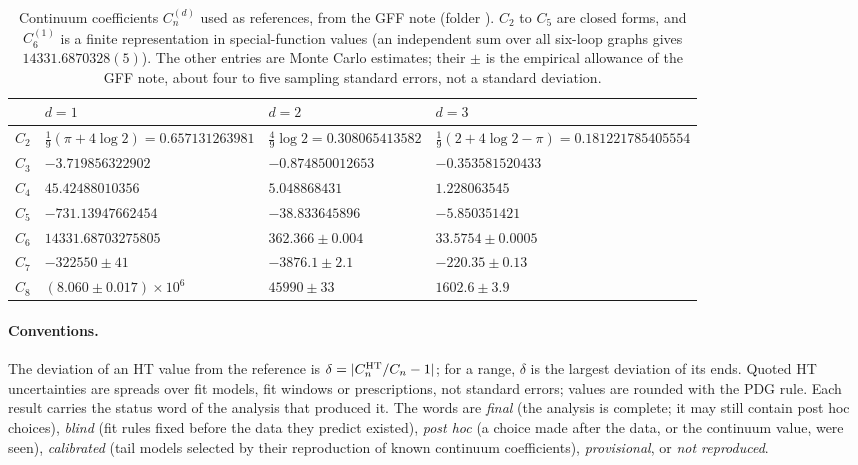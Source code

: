 \begin{table}[ht]
\centering\footnotesize\renewcommand{\arraystretch}{1.2}
\begin{tabular}{@{}clll@{}}
\toprule
 & $d=1$ & $d=2$ & $d=3$ \\
\midrule
$C_2$ & $\tfrac19(\pi+4\log2)=0.657131263981$ & $\tfrac49\log2=0.308065413582$ & $\tfrac19(2+4\log2-\pi)=0.181221785405554$ \\
$C_3$ & $-3.719856322902$ & $-0.874850012653$ & $-0.353581520433$ \\
$C_4$ & $45.42488010356$ & $5.048868431$ & $1.228063545$ \\
$C_5$ & $-731.13947662454$ & $-38.833645896$ & $-5.850351421$ \\
$C_6$ & $14331.68703275805$ & $362.366\pm0.004$ & $33.5754\pm0.0005$ \\
$C_7$ & $-322550\pm41$ & $-3876.1\pm2.1$ & $-220.35\pm0.13$ \\
$C_8$ & $(8.060\pm0.017)\times10^6$ & $45990\pm33$ & $1602.6\pm3.9$ \\
\bottomrule
\end{tabular}
\caption{Continuum coefficients $C_n^{(d)}$ used as references, from the GFF note (folder ). $C_2$ to
$C_5$ are closed forms, and $C_6^{(1)}$ is a finite representation in special-function values (an independent sum over
all six-loop graphs gives $14331.6870328(5)$). The other entries are Monte Carlo estimates; their $\pm$ is the empirical
allowance of the GFF note, about four to five sampling standard errors, not a standard deviation.}
\label{htp:tab:refvals}
\end{table}

\paragraph{Conventions.} The deviation of an HT value from the reference is $\delta=|C_n^{\rm HT}/C_n-1|$; for a range,
$\delta$ is the largest deviation of its ends. Quoted HT uncertainties are spreads over fit models, fit windows or
prescriptions, not standard errors; values are rounded with the PDG rule. Each result carries the status word of the
analysis that produced it. The words are \emph{final} (the analysis is complete; it may still contain post hoc
choices), \emph{blind} (fit rules fixed before the data they predict existed), \emph{post hoc} (a choice
made after the data, or the continuum value, were seen), \emph{calibrated} (tail models selected by their reproduction of
known continuum coefficients), \emph{provisional}, or \emph{not reproduced}.

